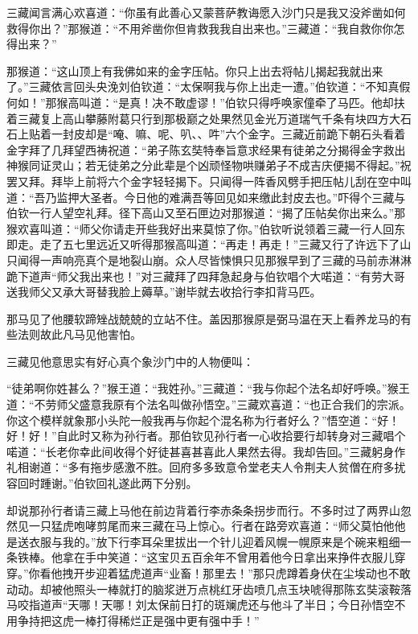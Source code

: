 \documentclass[12pt,UTF8]{ctexbook}
\begin{document}
{三藏闻言满心欢喜道：“你虽有此善心又蒙菩萨教诲愿入沙门只是我又没斧凿如何救得你出？”那猴道：“不用斧凿你但肯救我我自出来也。”三藏道：“我自救你你怎得出来？”

那猴道：“这山顶上有我佛如来的金字压帖。你只上出去将帖儿揭起我就出来了。”三藏依言回头央浼刘伯钦道：“太保啊我与你上出走一遭。”伯钦道：“不知真假何如！”那猴高叫道：“是真！决不敢虚谬！”伯钦只得呼唤家僮牵了马匹。他却扶着三藏复上高山攀藤附葛只行到那极巅之处果然见金光万道瑞气千条有块四方大石石上贴着一封皮却是“唵、嘛、呢、叭、、吽”六个金字。三藏近前跪下朝石头看着金字拜了几拜望西祷祝道：“弟子陈玄奘特奉旨意求经果有徒弟之分揭得金字救出神猴同证灵山；若无徒弟之分此辈是个凶顽怪物哄赚弟子不成吉庆便揭不得起。”祝罢又拜。拜毕上前将六个金字轻轻揭下。只闻得一阵香风劈手把压帖儿刮在空中叫道：“吾乃监押大圣者。今日他的难满吾等回见如来缴此封皮去也。”吓得个三藏与伯钦一行人望空礼拜。径下高山又至石匣边对那猴道：“揭了压帖矣你出来么。”那猴欢喜叫道：“师父你请走开些我好出来莫惊了你。”伯钦听说领着三藏一行人回东即走。走了五七里远近又听得那猴高叫道：“再走！再走！”三藏又行了许远下了山只闻得一声响亮真个是地裂山崩。众人尽皆悚惧只见那猴早到了三藏的马前赤淋淋跪下道声“师父我出来也！”对三藏拜了四拜急起身与伯钦唱个大喏道：“有劳大哥送我师父又承大哥替我脸上薅草。”谢毕就去收拾行李扣背马匹。

那马见了他腰软蹄矬战兢兢的立站不住。盖因那猴原是弼马温在天上看养龙马的有些法则故此凡马见他害怕。

三藏见他意思实有好心真个象沙门中的人物便叫：

“徒弟啊你姓甚么？”猴王道：“我姓孙。”三藏道：“我与你起个法名却好呼唤。”猴王道：“不劳师父盛意我原有个法名叫做孙悟空。”三藏欢喜道：“也正合我们的宗派。你这个模样就象那小头陀一般我再与你起个混名称为行者好么？”悟空道：“好！好！好！”自此时又称为孙行者。那伯钦见孙行者一心收拾要行却转身对三藏唱个喏道：“长老你幸此间收得个好徒甚喜甚喜此人果然去得。我却告回。”三藏躬身作礼相谢道：“多有拖步感激不胜。回府多多致意令堂老夫人令荆夫人贫僧在府多扰容回时踵谢。”伯钦回礼遂此两下分别。

却说那孙行者请三藏上马他在前边背着行李赤条条拐步而行。不多时过了两界山忽然见一只猛虎咆哮剪尾而来三藏在马上惊心。行者在路旁欢喜道：“师父莫怕他他是送衣服与我的。”放下行李耳朵里拔出一个针儿迎着风幌一幌原来是个碗来粗细一条铁棒。他拿在手中笑道：“这宝贝五百余年不曾用着他今日拿出来挣件衣服儿穿穿。”你看他拽开步迎着猛虎道声“业畜！那里去！”那只虎蹲着身伏在尘埃动也不敢动动。却被他照头一棒就打的脑浆迸万点桃红牙齿喷几点玉块唬得那陈玄奘滚鞍落马咬指道声“天哪！天哪！刘太保前日打的斑斓虎还与他斗了半日；今日孙悟空不用争持把这虎一棒打得稀烂正是强中更有强中手！”

}
\end{document}
